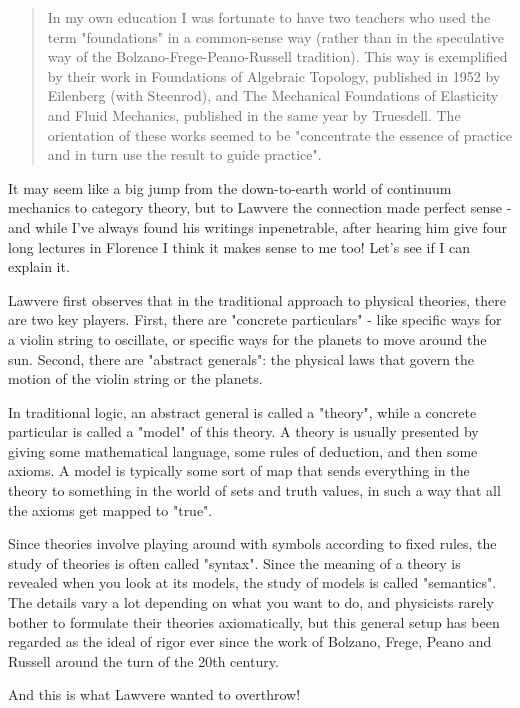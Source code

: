 \begin{quote}
     In my own education I was fortunate to have two teachers who used 
     the term "foundations" in a common-sense way (rather than in the 
     speculative way of the Bolzano-Frege-Peano-Russell tradition).  
     This way is exemplified by their work in Foundations of Algebraic 
     Topology, published in 1952 by Eilenberg (with Steenrod), and 
     The Mechanical Foundations of Elasticity and Fluid Mechanics, 
     published in the same year by Truesdell. The orientation of these 
     works seemed to be "concentrate the essence of practice and in turn
     use the result to guide practice". 
\end{quote}

It may seem like a big jump from the down-to-earth world of continuum 
mechanics to category theory, but to Lawvere the connection made perfect 
sense - and while I've always found his writings inpenetrable, after 
hearing him give four long lectures in Florence I think it makes sense 
to me too!  Let's see if I can explain it. 

Lawvere first observes that in the traditional approach to physical
theories, there are two key players.  First, there are "concrete
particulars" - like specific ways for a violin string to
oscillate, or specific ways for the planets to move around the sun.
Second, there are "abstract generals": the physical laws
that govern the motion of the violin string or the planets.

In traditional logic, an abstract general is called a
"theory", while a concrete particular is called a
"model" of this theory.  A theory is usually presented by
giving some mathematical language, some rules of deduction, and then
some axioms.  A model is typically some sort of map that sends
everything in the theory to something in the world of sets and truth
values, in such a way that all the axioms get mapped to
"true".

Since theories involve playing around with symbols according to fixed
rules, the study of theories is often called "syntax".
Since the meaning of a theory is revealed when you look at its models,
the study of models is called "semantics".  The details vary
a lot depending on what you want to do, and physicists rarely bother
to formulate their theories axiomatically, but this general setup has
been regarded as the ideal of rigor ever since the work of Bolzano,
Frege, Peano and Russell around the turn of the 20th century.

And this is what Lawvere wanted to overthrow!  

